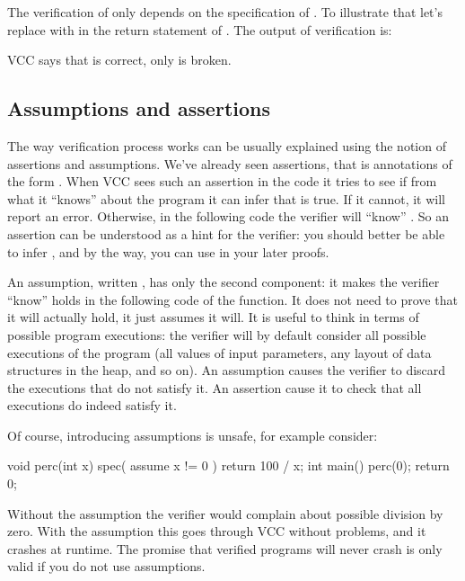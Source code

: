 The verification of  only depends on the specification of .
To illustrate that let's replace \vcc{<} with \vcc{>} in the return statement of .
The output of verification is:


\noindent
VCC says that  is correct, only  is broken.

\subsection{Assumptions and assertions}

The way verification process works can be usually explained using the
notion of assertions and assumptions.
We've already seen assertions, that is annotations of the form .
When VCC sees such an assertion in the code
it tries to see if from what it ``knows'' about the program it can infer
that  is true.
If it cannot, it will report an error.
Otherwise, in the following code the verifier will ``know'' .
So an assertion can be understood as a hint for the verifier:
you should better be able to infer , and by the way, you can use
 in your later proofs.

An assumption, written , has only the second component:
it makes the verifier ``know''  holds in the following code of the function.
It does not need to prove that it will actually hold, it just assumes it will.
It is useful to think in terms of possible program executions: the verifier
will by default consider all possible executions of the program (\eg all values
of input parameters, any layout of data structures in the heap, and so on).
An assumption causes the verifier to discard the executions that do not satisfy it.
An assertion cause it to check that all executions do indeed satisfy it.

Of course, introducing assumptions is unsafe, for example consider:

\begin{VCC}
void perc(int x) {
  spec( assume x != 0 )
  return 100 / x;
}
int main()
{
  perc(0);
  return 0;
}
\end{VCC}

\noindent
Without the assumption the verifier would complain about possible division by zero.
With the assumption this goes through VCC without problems, and it crashes at runtime.
The promise that verified programs will never crash is only valid if you do not
use assumptions.

